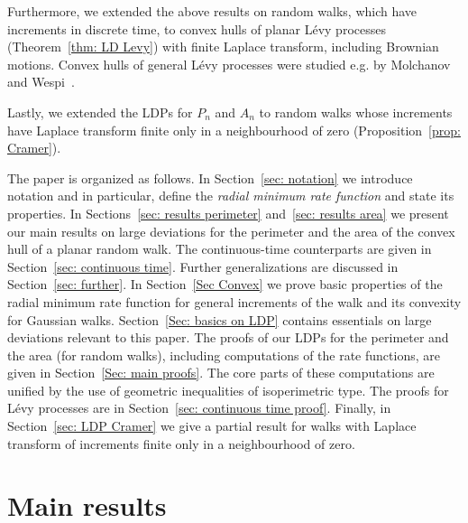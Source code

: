 \documentclass[10pt]{amsart}
\theoremstyle{definition}\newtheorem{defi}[theo]{Definition}\newtheorem{rema}[theo]{Remark}\newtheorem{exam}[theo]{Example}\newtheorem{exem}[theo]{Example}\newtheorem{nota}[theo]{Notation}
\begin{document}
Furthermore, we extended the above results on random walks, which have increments in discrete time, to convex hulls of planar L\'evy processes (Theorem~\ref{thm: LD Levy}) with finite Laplace transform, including Brownian motions. Convex hulls of general L\'evy processes were studied e.g. by Molchanov and Wespi~\cite{MolchanovWespi}.

Lastly, we extended the LDPs for $P_n$ and $A_n$ to random walks whose increments have Laplace transform finite only in a neighbourhood of zero (Proposition~\ref{prop: Cramer}).

The paper is organized as follows. In Section~\ref{sec: notation} we introduce notation and in particular, define the \emph{radial minimum rate function} and state its properties. In Sections~\ref{sec: results perimeter} and~\ref{sec: results area} we present our main results on large deviations for the perimeter and the area of the convex hull of a planar random walk. The continuous-time counterparts are given in Section~\ref{sec: continuous time}. Further generalizations are discussed in Section~\ref{sec: further}. In Section~\ref{Sec Convex} we prove basic properties of the radial minimum rate function for general increments of the walk and its convexity for Gaussian walks. Section~\ref{Sec: basics on LDP} contains essentials on large deviations relevant to this paper. The proofs of our LDPs for the perimeter and the area (for random walks), including computations of the rate functions, are given in Section~\ref{Sec: main proofs}. The core parts of these computations are unified by the use of geometric inequalities of isoperimetric type. The proofs for L\'evy processes are in Section~\ref{sec: continuous time proof}. Finally, in Section~\ref{sec: LDP Cramer} we give a partial result for walks with Laplace transform of increments finite only in a neighbourhood of zero.

\section{Main results}
\end{document}
